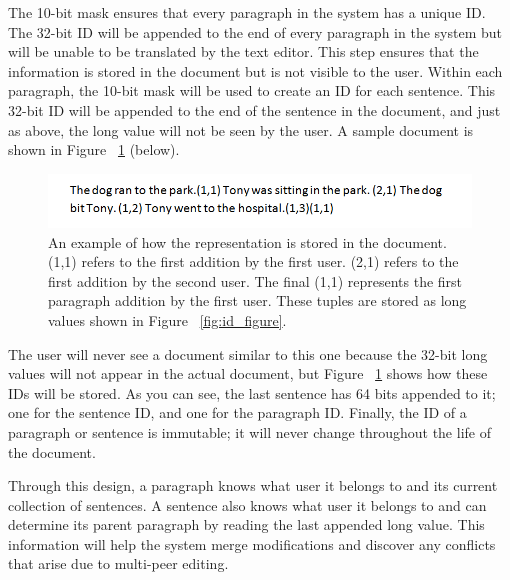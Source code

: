 The 10-bit mask ensures that every paragraph in the system has a unique ID. The 32-bit ID will be appended to the end of every paragraph in the system but will be unable to be translated by the text editor. This step ensures that the information is stored in the document but is not visible to the user. Within each paragraph, the 10-bit mask will be used to create an ID for each sentence. This 32-bit ID will be appended to the end of the sentence in the document, and just as above, the long value will not be seen by the user. A sample document is shown in Figure ~\ref{fig:file_figure} (below).

\begin{figure}[b]
\includegraphics[scale=0.55]{Figure2.png}
\caption{An example of how the representation is stored in the document. (1,1) refers to the first addition by the first user. (2,1) refers to the first addition by the second user. The final (1,1) represents the first paragraph addition by the first user. These tuples are stored as long values shown in Figure ~\ref{fig:id_figure}.}
\label{fig:file_figure}
\end{figure}

The user will never see a document similar to this one because the 32-bit long values will not appear in the actual document, but Figure ~\ref{fig:file_figure} shows how these IDs will be stored. As you can see, the last sentence has 64 bits appended to it; one for the sentence ID, and one for the paragraph ID.  Finally, the ID of a paragraph or sentence is immutable; it will never change throughout the life of the document.

Through this design, a paragraph knows what user it belongs to and its current collection of sentences. A sentence also knows what user it belongs to and can determine its parent paragraph by reading the last appended long value. This information will help the system merge modifications and discover any conflicts that arise due to multi-peer editing.
